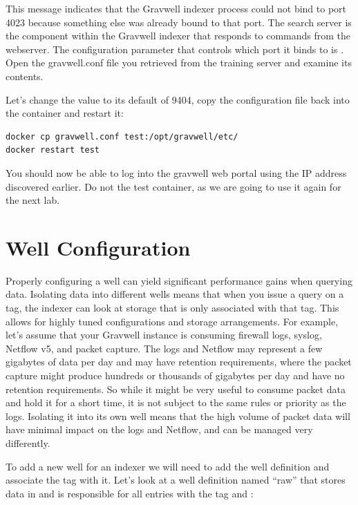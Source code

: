 
This message indicates that the Gravwell indexer process could not bind
to port 4023 because something else was already bound to that port. The
search server is the component within the Gravwell indexer that responds
to commands from the webserver. The configuration parameter that
controls which port it binds to is . Open the
gravwell.conf file you retrieved from the training server and examine
its contents.

Let's change the  value to its default of 9404, copy
the configuration file back into the container and restart it:


\begin{Verbatim}[breaklines=true]
docker cp gravwell.conf test:/opt/gravwell/etc/
docker restart test
\end{Verbatim}

You should now be able to log into the gravwell web portal using the IP
address discovered earlier. Do not  the test container, as we are
going to use it again for the next lab.

\section{Well Configuration}
Properly configuring a well can yield significant performance gains
when querying data. Isolating data into different wells means that when
you issue a query on a tag, the indexer can look at storage that is only
associated with that tag. This allows for highly tuned configurations
and storage arrangements. For example, let's assume that your Gravwell
instance is consuming firewall logs, syslog, Netflow v5, and packet
capture. The logs and Netflow may represent a few gigabytes of data per
day and may have retention requirements, where the packet capture might
produce hundreds or thousands of gigabytes per day and have no retention
requirements. So while it might be very useful to consume packet data
and hold it for a short time, it is not subject to the same rules or
priority as the logs. Isolating it into its own well means that the
high volume of packet data will have minimal impact on the logs and
Netflow, and can be managed very differently.

To add a new well for an indexer we will need to add the well
definition and associate the tag with it. Let's look at a well
definition named ``raw'' that stores data in
 and is responsible for all entries with
the tag  and : 

